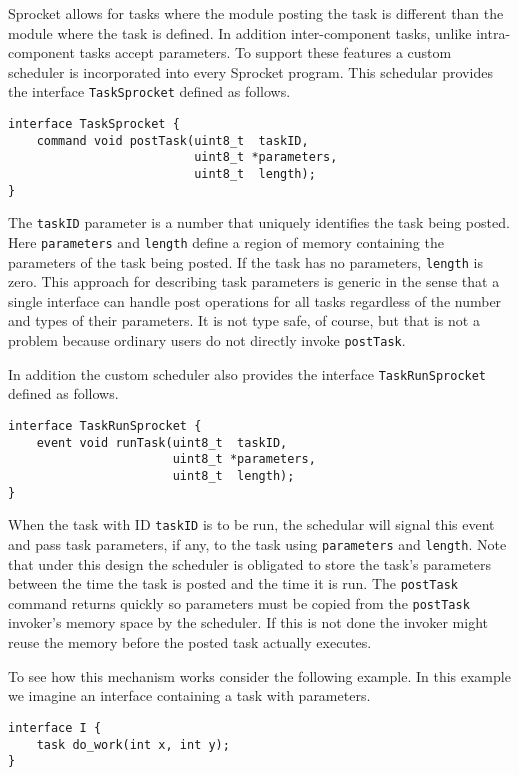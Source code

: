 Sprocket allows for  tasks where the module posting the task is
different than the module where the task is defined. In addition inter-component tasks, unlike
intra-component tasks accept parameters. To support these features a custom scheduler is
incorporated into every Sprocket program. This schedular provides the interface
\texttt{TaskSprocket} defined as follows.
\begin{verbatim}
interface TaskSprocket {
    command void postTask(uint8_t  taskID,
                          uint8_t *parameters,
                          uint8_t  length);
}
\end{verbatim}

The \texttt{taskID} parameter is a number that uniquely identifies the task being posted. Here
\texttt{parameters} and \texttt{length} define a region of memory containing the parameters of
the task being posted. If the task has no parameters, \texttt{length} is zero. This approach for
describing task parameters is generic in the sense that a single interface can handle post
operations for all tasks regardless of the number and types of their parameters. It is not type
safe, of course, but that is not a problem because ordinary users do not directly invoke
\texttt{postTask}.

In addition the custom scheduler also provides the interface \texttt{TaskRunSprocket} defined as
follows.
\begin{verbatim}
interface TaskRunSprocket {
    event void runTask(uint8_t  taskID,
                       uint8_t *parameters,
                       uint8_t  length);
}
\end{verbatim}

When the task with ID \texttt{taskID} is to be run, the schedular will signal this event and
pass task parameters, if any, to the task using \texttt{parameters} and \texttt{length}. Note
that under this design the scheduler is obligated to store the task's parameters between the
time the task is posted and the time it is run. The \texttt{postTask} command returns quickly so
parameters must be copied from the \texttt{postTask} invoker's memory space by the scheduler. If
this is not done the invoker might reuse the memory before the posted task actually executes.

To see how this mechanism works consider the following example. In this example we imagine an
interface containing a task with parameters.
\begin{verbatim}
interface I {
    task do_work(int x, int y);
}
\end{verbatim}


